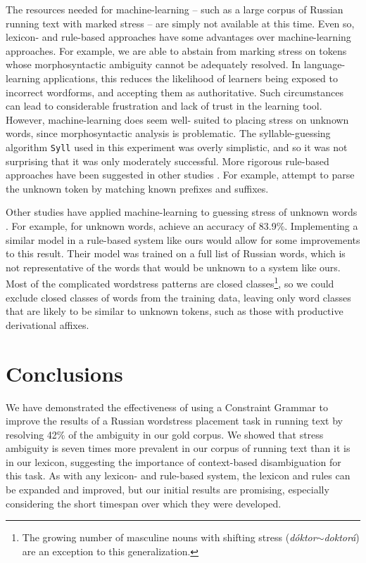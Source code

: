 \documentclass[11pt]{article}
\begin{document}
The resources needed for machine-learning --
such as a large corpus of Russian running text with marked stress -- are simply
not available at this time. Even so, lexicon- and rule-based approaches have
some advantages over machine-learning approaches. For example, we are able to
abstain from marking stress on tokens whose morphosyntactic ambiguity cannot be
adequately resolved. In language-learning applications, this reduces the 
likelihood of learners being exposed to incorrect wordforms, and accepting them
as authoritative. Such circumstances can lead to considerable frustration and
lack of trust in the learning tool. However, machine-learning does seem well-
suited to
placing stress on unknown words, since morphosyntactic analysis is problematic.
The syllable-guessing algorithm {\small {\tt Syll}} used in this experiment was 
overly simplistic, and so it was not surprising that it was only moderately 
successful. More rigorous rule-based approaches have been suggested in other 
studies \cite{Church-85,Williams-87,Xomicevic_2008}. For example, 
 attempt to parse the unknown token by matching known 
prefixes and suffixes.

Other studies have applied machine-learning to guessing stress of unknown words
\cite{Pearson.ea-00,Webster-04,Dou.ea-09,hall_sproat_russian_2013}. For example,
for unknown words,  achieve an accuracy of 
83.9\%. Implementing a similar model in a rule-based system like ours would allow 
for some improvements to this result. Their model was trained on a full list of 
Russian words, which is not representative of the words that would be unknown to 
a system like ours. Most of the complicated wordstress patterns are closed 
classes\footnote{The growing number of masculine nouns with shifting stress 
(\emph{d\'{o}ktor$\sim$doktor\'{a}}) are an exception to this generalization.},
so we could exclude closed classes of words from the training data, leaving only
word classes that are likely to be similar to unknown tokens, such as those with 
productive derivational affixes.

\section{Conclusions}

We have demonstrated the effectiveness of using a Constraint Grammar to improve
the results of a Russian wordstress placement task in running text by resolving
42\% of the ambiguity in our gold corpus. We showed
that stress ambiguity is seven times more prevalent in our corpus of running text
than it is in our lexicon, suggesting the importance of context-based
disambiguation for this task.  As with any 
lexicon- and rule-based system, the lexicon and rules can be expanded and 
improved, but our initial results are promising, especially considering the short 
timespan over which they were developed.
\end{document}
